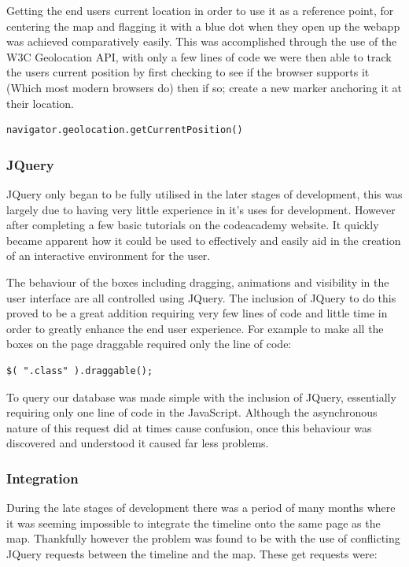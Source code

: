 \documentclass{l3proj}
\begin{document}
Getting the end users current location in order to use it as a reference point, for centering the map and flagging it with a blue dot when they open up the webapp was achieved comparatively easily. This was accomplished through the use of the \gls{W3C} Geolocation API, with only a few lines of code we were then able to track the users current position by first checking to see if the browser supports it (Which most modern browsers do) then if so; create a new marker anchoring it at their location.

\begin{verbatim}
navigator.geolocation.getCurrentPosition()
\end{verbatim}

\subsubsection{JQuery}

JQuery only began to be fully utilised in the later stages of development, this was largely due to having very little experience in it's uses for development. However after completing a few basic tutorials on the codeacademy website. It quickly became apparent how it could be used to effectively and easily aid in the creation of an interactive environment for the user.

The behaviour of the boxes including dragging, animations and visibility in the user interface are all controlled using JQuery. The inclusion of JQuery to do this proved to be a great addition requiring very few lines of code and little time in order to greatly enhance the end user experience. For example to make all the boxes on the page draggable required only the line of code:

\begin{verbatim}
$( ".class" ).draggable();
\end{verbatim}

To query our database was made simple with the inclusion of JQuery, essentially requiring only one line of code in the JavaScript. Although the asynchronous nature of this request did at times cause confusion, once this behaviour was discovered and understood it caused far less problems.

\subsubsection{Integration}

During the late stages of development there was a period of many months where it was seeming impossible to integrate the timeline onto the same page as the map. Thankfully however the problem was found to be with the use of conflicting JQuery requests between the timeline and the map. These get requests were:
\end{document}
